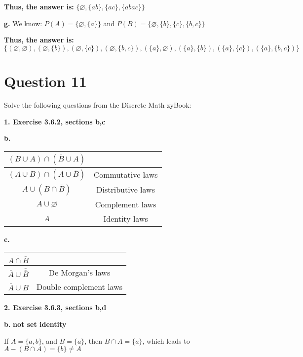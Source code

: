 \documentclass[11pt]{article}
\begin{document}
	\textbf{Thus, the answer is:}
	$\{\varnothing,\{ab\},\{ac\},\{abac\}\}$
	
	\textbf{g.}
	We know: $P(A)=\{\varnothing, \{a\}\}$ and $P(B)=\{\varnothing,\{b\},\{c\},\{b,c\}\}$
	
	\textbf{Thus, the answer is:}
	$\{(\varnothing,\varnothing),(\varnothing,\{b\}),(\varnothing,\{c\}),(\varnothing,\{b,c\}),(\{a\},\varnothing),(\{a\},\{b\}),(\{a\},\{c\}),(\{a\},\{b,c\})\}$
	
	\newpage
	\section*{Question 11}
	
	Solve the following questions from the Discrete Math zyBook:
	
	\textbf{1. Exercise 3.6.2, sections b,c}
	
	\textbf{b.}
	\begin{center}
	\begin{tabular}{||c c||} 
    \hline
    $(B\cup A)\cap (\overline{B}\cup A)$ & \\ [0.5ex] 
    \hline\hline
    $(A\cup B)\cap (A\cup \overline{B})$ & Commutative laws \\ 
    \hline
    $A\cup (B\cap \overline{B})$ & Distributive laws \\
    \hline
    $A\cup \varnothing$ & Complement laws \\
    \hline
    $A$ & Identity laws \\
    \hline
    \end{tabular}
	\end{center}
	
	\textbf{c.}
	\begin{center}
	\begin{tabular}{||c c||} 
    \hline
    $\overline{A\cap \overline{B}}$ & \\ [0.5ex] 
    \hline\hline
    $\overline{A}\cup \overline{\overline{B}}$ & De Morgan's laws \\ 
    \hline
    $\overline{A}\cup B$ & Double complement laws \\
    \hline
    \end{tabular}
	\end{center}
	
	\vspace{10mm}
	\textbf{2. Exercise 3.6.3, sections b,d}
	
	\textbf{b.}
	\textbf{not set identity}
	
	If $A=\{a,b\}$, and $B=\{a\}$, then $B\cap A=\{a\}$, which leads to $A-(B\cap A)=\{b\}\neq A$
	
\end{document}
